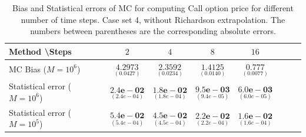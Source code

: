 \documentclass[11pt]{article}
\begin{document}
\begin{table}[h!]
	\centering
	\begin{tabular}{l*{6}{c}r}
		Method \textbackslash  Steps            & $2$ & $4$ & $8$ & $16$  \\
		\hline
		MC Bias ($M=10^6$)   & 	$ \underset{(0.0427)}{\mathbf{4.2973}}$  & $\underset{(  0.0234)}{\mathbf{2.3592}}$  & $\underset{(    0.0140)}{\mathbf{1.4125}}$ & $\underset{(
			0.0077)}{\mathbf{0.777}}$\\ 
		
		Statistical error ($M=10^6$)  &  $\underset{(2.4e-04)} {\mathbf{2.4e-02}}$  & $\underset{(1.8e-04)} {\mathbf{1.8e-02}}$  & $\underset{(9.4e-05)} {\mathbf{9.5e-03}}$ & $\underset{(6.0e-05)} {\mathbf{6.0e-03}}$	\\
		
		
		Statistical error ($M=10^5$)  &  $\underset{(5.4e-04)} {\mathbf{5.4e-02}}$  & $\underset{(4.5e-04)} {\mathbf{4.5e-02}}$  & $\underset{(2.2e-04)} {\mathbf{2.2e-02}}$ & $\underset{(1.6e-04)} {\mathbf{1.6e-02}}$	\\
		
		\hline
	\end{tabular}
	\caption{Bias and Statistical errors of MC  for computing Call option price  for different number of time steps. Case set 4, without Richardson extrapolation. The numbers between parentheses are the corresponding absolute errors.}
	\label{Bias and Statistical errors of MC ($M=10^6$)  for computing Call option price  for different number of time steps. Case set 4, without Richardson extrapolation. The numbers between parentheses are the corresponding absolute errors.}
\end{table}
\end{document}
